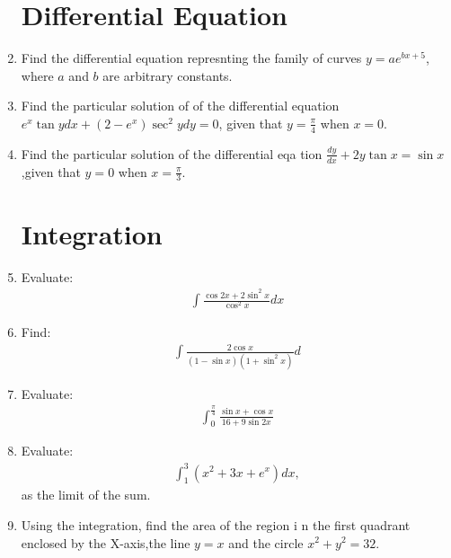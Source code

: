 \documentclass[10pt,-letter paper]{article}
\providecommand{\brak}[1]{\ensuremath{\left(#1\right)}}
\begin{document}
\begin{enumerate}
\section{Differential Equation}
\item Find the differential equation represnting the family of curves $y=ae^{bx+5}$, where $a$ and $b$ are arbitrary constants.
\item Find the particular solution of of the differential   equation $e^{x}\tan y dx +\brak{2-e^{x}}\sec^{2}y dy=0$, given that $y=\frac{\pi}{4}$ when $x=0$.
\item Find the particular solution of the differential eqa tion $\frac{dy}{dx}+2y\tan x =\sin x$,given that $y=0$ when $x=\frac{\pi}{3}$.




\section{Integration}	
\item Evaluate:
\begin{align*}
\int\frac{\cos 2x+2\sin^{2}x}{\cos^{2}x}dx
\end{align*}

\item Find:                                               \begin{align*}                                            \int\frac{2\cos x}{\brak{1-\sin x}\brak{1+\sin^{2}x}}d
\end{align*}

\item Evaluate:                                          
\begin{align*}                                            \int_{0}^{\frac{\pi}{4}}\frac{\sin x+\cos x}{16+9\sin 2x} \end{align*}  

\item Evaluate:                                            \begin{align*}                                             \int_{1}^{3} \brak{x^{2}+3x+e^{x}}dx,                      \end{align*}                                                      as the limit of the sum.    

\item Using the integration, find the area of the region i n the first quadrant enclosed by the X-axis,the line $y=x$ and the circle $x^{2}+y^{2}=32$.






\end{enumerate}
\end{document}
